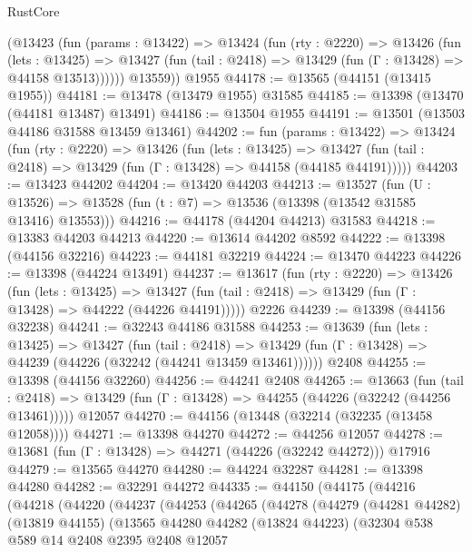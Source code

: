 \begin{lexlean}{RustCore}
\begin{coremodule}
        (@13423
          (fun (params : @13422) =>
          @13424
            (fun (rty : @2220) =>
            @13426
              (fun (lets : @13425) =>
              @13427 (fun (tail : @2418) => @13429 (fun (Γ : @13428) => @44158 @13513))))))
        @13559))
    @1955
@44178 := @13565 (@44151 (@13415 @1955))
@44181 := @13478 (@13479 @1955) @31585
@44185 := @13398 (@13470 (@44181 @13487) @13491)
@44186 := @13504 @1955
@44191 := @13501 (@13503 @44186 @31588 @13459 @13461)
@44202 := fun (params : @13422) =>
  @13424
    (fun (rty : @2220) =>
    @13426
      (fun (lets : @13425) =>
      @13427 (fun (tail : @2418) => @13429 (fun (Γ : @13428) => @44158 (@44185 @44191)))))
@44203 := @13423 @44202
@44204 := @13420 @44203
@44213 := @13527
    (fun (U : @13526) => @13528 (fun (t : @7) => @13536 (@13398 (@13542 @31585 @13416) @13553)))
@44216 := @44178 (@44204 @44213) @31583
@44218 := @13383 @44203 @44213
@44220 := @13614 @44202 @8592
@44222 := @13398 (@44156 @32216)
@44223 := @44181 @32219
@44224 := @13470 @44223
@44226 := @13398 (@44224 @13491)
@44237 := @13617
    (fun (rty : @2220) =>
    @13426
      (fun (lets : @13425) =>
      @13427 (fun (tail : @2418) => @13429 (fun (Γ : @13428) => @44222 (@44226 @44191)))))
    @2226
@44239 := @13398 (@44156 @32238)
@44241 := @32243 @44186 @31588
@44253 := @13639
    (fun (lets : @13425) =>
    @13427
      (fun (tail : @2418) =>
      @13429 (fun (Γ : @13428) => @44239 (@44226 (@32242 (@44241 @13459 @13461))))))
    @2408
@44255 := @13398 (@44156 @32260)
@44256 := @44241 @2408
@44265 := @13663
    (fun (tail : @2418) => @13429 (fun (Γ : @13428) => @44255 (@44226 (@32242 (@44256 @13461)))))
    @12057
@44270 := @44156 (@13448 (@32214 (@32235 (@13458 @12058))))
@44271 := @13398 @44270
@44272 := @44256 @12057
@44278 := @13681 (fun (Γ : @13428) => @44271 (@44226 (@32242 @44272))) @17916
@44279 := @13565 @44270
@44280 := @44224 @32287
@44281 := @13398 @44280
@44282 := @32291 @44272
@44335 := @44150
    (@44175
      (@44216
        (@44218
          (@44220
            (@44237
              (@44253
                (@44265
                  (@44278
                    (@44279
                      (@44281 @44282)
                      (@13819 @44155)
                      (@13565
                        @44280
                        @44282
                        (@13824 @44223)
                        (@32304
                          @538
                          @589
                          @14
                          @2408
                          @2395
                          @2408
                          @12057

\end{coremodule}
\end{lexlean}
